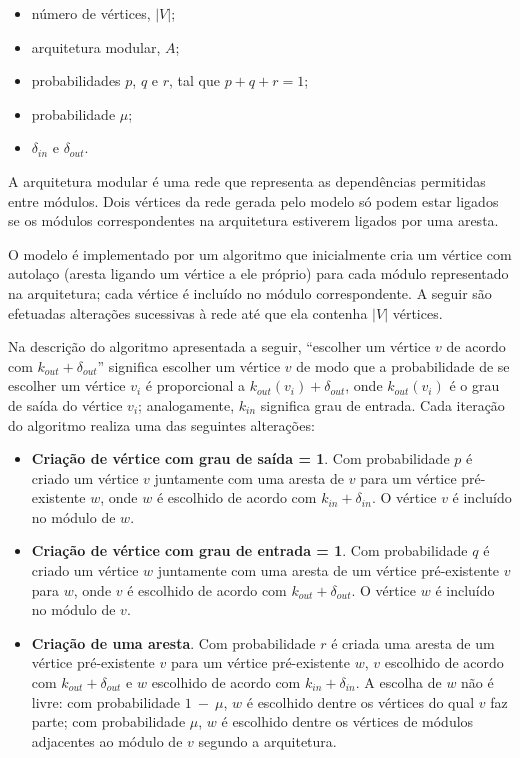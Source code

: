 \documentclass{acm_proc_article-sp}
\begin{document}
\begin{itemize}
  \item número de vértices, $|V|$;
  \item arquitetura modular, $A$;
  \item probabilidades $p$, $q$ e $r$, tal que $p + q + r = 1$;
  \item probabilidade $\mu$;
  \item $\delta_{in}$ e $\delta_{out}$.
\end{itemize}

A arquitetura modular é uma rede que representa as dependências permitidas entre módulos. Dois vértices da rede gerada pelo modelo só podem estar ligados se os módulos correspondentes na arquitetura estiverem ligados por uma aresta.


O modelo é implementado por um algoritmo que inicialmente cria um vértice com autolaço (aresta ligando um vértice a ele próprio) para cada módulo representado na arquitetura; cada vértice é incluído no módulo correspondente. A seguir são efetuadas alterações sucessivas à rede até que ela contenha $|V|$ vértices.

Na descrição do algoritmo apresentada a seguir, ``escolher um vértice $v$ de acordo com $k_{out} + \delta_{out}$'' significa escolher um vértice $v$ de modo que a probabilidade de se escolher um vértice $v_i$ é proporcional a $k_{out}(v_i) + \delta_{out}$, onde $k_{out}(v_i)$ é o grau de saída do vértice $v_i$; analogamente, $k_{in}$ significa grau de entrada. Cada iteração do algoritmo realiza uma das seguintes alterações:

\begin{itemize}
  \item \textbf{Criação de vértice com grau de saída = 1}. Com probabilidade $p$ é criado um vértice $v$ juntamente com uma aresta de $v$ para um vértice pré-existente $w$, onde $w$ é escolhido de acordo com $k_{in} + \delta_{in}$. O vértice $v$ é incluído no módulo de $w$.
  \item \textbf{Criação de vértice com grau de entrada = 1}. Com probabilidade $q$ é criado um vértice $w$ juntamente com uma aresta de um vértice pré-existente $v$ para $w$, onde $v$ é escolhido de acordo com $k_{out} + \delta_{out}$. O vértice $w$ é incluído no módulo de $v$.
  \item \textbf{Criação de uma aresta}. Com probabilidade $r$ é criada uma aresta de um vértice pré-existente $v$ para um vértice pré-existente $w$, $v$ escolhido de acordo com $k_{out} + \delta_{out}$ e $w$ escolhido de acordo com $k_{in} + \delta_{in}$. A escolha de $w$ não é livre: com probabilidade $1~-~\mu$, $w$ é escolhido dentre os vértices do qual $v$ faz parte; com probabilidade $\mu$, $w$ é escolhido dentre os vértices de módulos adjacentes ao módulo de $v$ segundo a arquitetura. 
\end{itemize}
\end{document}
